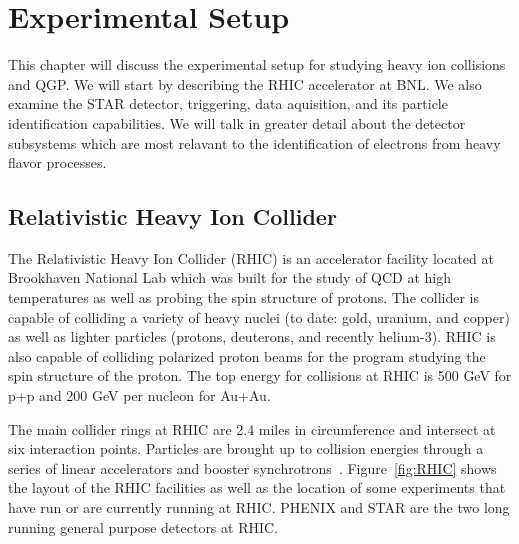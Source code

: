 \chapter{Experimental Setup}

This chapter will discuss the experimental setup for studying heavy ion collisions and QGP. We will start by describing the RHIC accelerator at BNL. We also examine the STAR detector, triggering, data aquisition, and its particle identification capabilities. We will talk in greater detail about the detector subsystems which are most relavant to the identification of electrons from heavy flavor processes. 

\section{Relativistic Heavy Ion Collider}

The Relativistic Heavy Ion Collider (RHIC) is an accelerator facility located at Brookhaven National Lab which was built for the study of QCD at high temperatures as well as probing the spin structure of protons. The collider is capable of colliding a variety of heavy nuclei (to date: gold, uranium, and copper) as well as lighter particles (protons, deuterons, and recently helium-3). RHIC is also capable of colliding polarized proton beams for the program studying the spin structure of the proton. The top energy for collisions at RHIC is 500 GeV for p+p and 200 GeV per nucleon for Au+Au. 

The main collider rings at RHIC are 2.4 miles in circumference and intersect at six interaction points. Particles are brought up to collision energies through a series of linear accelerators and booster synchrotrons~\cite{RHICacc}. Figure~\ref{fig:RHIC} shows the layout of the RHIC facilities as well as the location of some experiments that have run or are currently running at RHIC. PHENIX and STAR are the two long running general purpose detectors at RHIC.

